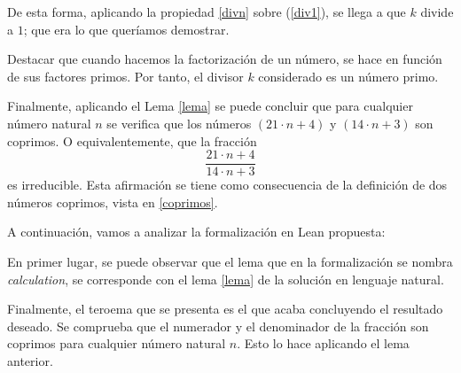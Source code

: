 \begin{demostracion}
  De esta forma, aplicando la propiedad \ref{divn} sobre (\ref{div1}),
  se llega a que \(k\) divide a \(1\); que era lo que queríamos demostrar.
\end{demostracion}

Destacar que cuando hacemos la factorización de un número, se hace en
función de sus factores primos. Por tanto, el divisor \(k\) considerado
es un número primo.

Finalmente, aplicando el Lema \ref{lema} se puede concluir que para
cualquier número natural \(n\) se verifica que los números \( (21⋅n+4)\)
y \((14⋅n+3)\) son coprimos. O equivalentemente, que la fracción
\begin{equation*}
  \frac{21⋅n+4}{14⋅n+3}
\end{equation*}
es irreducible. Esta afirmación se tiene como consecuencia de la
definición de dos números coprimos, vista en \ref{coprimos}.

A continuación, vamos a analizar la formalización en Lean propuesta:


En primer lugar, se puede observar que el lema que en la
formalización se nombra \textit{calculation}, se corresponde con
el lema \ref{lema} de la solución en lenguaje natural.

Finalmente, el teroema que se presenta es el que acaba concluyendo
el resultado deseado. Se comprueba que el numerador y el denominador
de la fracción son coprimos para cualquier número natural \(n\).
Esto lo hace aplicando el lema anterior.

